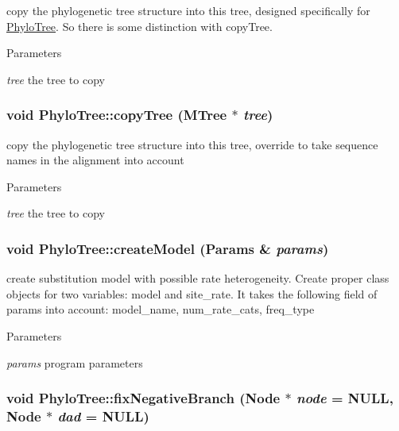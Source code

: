 \label{classPhyloTree_a195bfdd19700eb12a6680ced3bc5193b}
copy the phylogenetic tree structure into this tree, designed specifically for \hyperlink{classPhyloTree}{PhyloTree}. So there is some distinction with copyTree. 
\begin{DoxyParams}{Parameters}
\item[{\em tree}]the tree to copy \end{DoxyParams}
\hypertarget{classPhyloTree_adce7d871ad6fb36424fab1aa2b688f9a}{
\subsubsection[{copyTree}]{\setlength{\rightskip}{0pt plus 5cm}void PhyloTree::copyTree ({\bf MTree} $\ast$ {\em tree})}}
\label{classPhyloTree_adce7d871ad6fb36424fab1aa2b688f9a}
copy the phylogenetic tree structure into this tree, override to take sequence names in the alignment into account 
\begin{DoxyParams}{Parameters}
\item[{\em tree}]the tree to copy \end{DoxyParams}
\hypertarget{classPhyloTree_afd022a3beda4f24e47b71046d56d4fbf}{
\subsubsection[{createModel}]{\setlength{\rightskip}{0pt plus 5cm}void PhyloTree::createModel ({\bf Params} \& {\em params})}}
\label{classPhyloTree_afd022a3beda4f24e47b71046d56d4fbf}
create substitution model with possible rate heterogeneity. Create proper class objects for two variables: model and site\_\-rate. It takes the following field of params into account: model\_\-name, num\_\-rate\_\-cats, freq\_\-type 
\begin{DoxyParams}{Parameters}
\item[{\em params}]program parameters \end{DoxyParams}
\hypertarget{classPhyloTree_a80df879587ccb9aa1b9b54103e87ab8a}{
\subsubsection[{fixNegativeBranch}]{\setlength{\rightskip}{0pt plus 5cm}void PhyloTree::fixNegativeBranch ({\bf Node} $\ast$ {\em node} = {\ttfamily NULL}, \/  {\bf Node} $\ast$ {\em dad} = {\ttfamily NULL})}}
